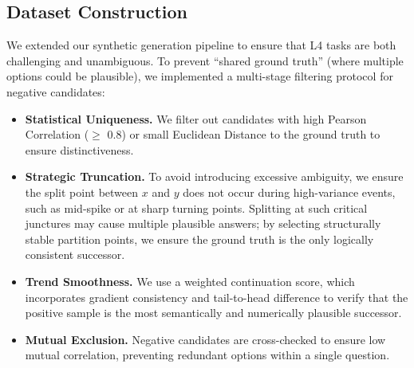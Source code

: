 \documentclass[11pt]{article}
\begin{document}
\begin{table}[t]
\centering
{}
\caption{Performance comparison on \textbf{out-of-distribution datasets} in L4 (Generative Inference).}
\label{tab:l4_results}
\end{table}

\subsection{Dataset Construction}
We extended our synthetic generation pipeline to ensure that L4 tasks are both challenging and unambiguous. To prevent ``shared ground truth'' (where multiple options could be plausible), we implemented a multi-stage filtering protocol for negative candidates:
\begin{itemize}[left=0pt]
    \item \textbf{Statistical Uniqueness.} We filter out candidates with high Pearson Correlation ($\geq$ 0.8) or small Euclidean Distance to the ground truth to ensure distinctiveness.
    \item \textbf{Strategic Truncation.} To avoid introducing excessive ambiguity, we ensure the split point between $x$ and $y$ does not occur during high-variance events, such as mid-spike or at sharp turning points. Splitting at such critical junctures may cause multiple plausible answers; by selecting structurally stable partition points, we ensure the ground truth is the only logically consistent successor.
    \item \textbf{Trend Smoothness.} We use a weighted continuation score, which incorporates gradient consistency and tail-to-head difference to verify that the positive sample is the most semantically and numerically plausible successor.
    \item \textbf{Mutual Exclusion.} Negative candidates are cross-checked to ensure low mutual correlation, preventing redundant options within a single question.
\end{itemize}
\end{document}
